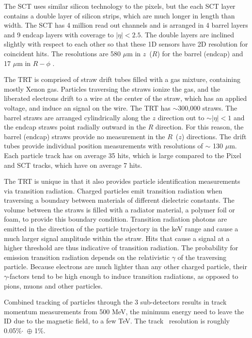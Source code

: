 The SCT uses similar silicon technology to the pixels, but the each SCT layer contains a double layer of silicon strips, which are much longer in length than width. The SCT has 4 million read out channels and is arranged in 4 barrel layers and 9 endcap layers with coverage to $|\eta| < 2.5$. The double layers are inclined slightly with respect to each other so that these 1D sensors have 2D resolution for coincident hits. The resolutions are 580 $\mu$m in $z$\ ($R$) for the barrel (endcap) and 17 $\mu$m in $R-\phi$ .

The TRT is comprised of straw drift tubes filled with a gas mixture, containing mostly Xenon gas. Particles traversing the straws ionize the gas, and the liberated electrons drift to a wire at the center of the straw, which has an applied voltage, and induce an signal on the wire. The TRT has $\sim$300,000 straws. The barrel straws are arranged cylindrically along the $z$ direction out to $\sim|\eta| < 1$ and the endcap straws point radially outward in the $R$ direction. For this reason, the barrel (endcap) straws provide no measurement in the $R$\ ($z$) directions. The drift tubes provide individual position measurements with resolutions of $\sim$ 130 $\mu$m. Each particle track has on average 35 hits, which is large compared to the Pixel and SCT tracks, which have on average 7 hits. 

The TRT is unique in that it also provides particle identification measurements via transition radiation. Charged particles emit transition radiation when traversing a boundary between materials of different dielectric constants. The volume between the straws is filled with a radiator material, a polymer foil or foam, to provide this boundary condition. Transition radiation photons are emitted in the direction of the particle trajectory in the keV range and cause a much larger signal amplitude within the straw. Hits that cause a signal at a higher threshold are thus indicative of transition radiation.  The probability for emission transition radiation depends on the relativistic $\gamma$ of the traversing particle. Because electrons are much lighter than any other charged particle, their $\gamma$-factors tend to be high enough to induce transition radiations, as opposed to pions, muons and other particles. 

Combined tracking of particles through the 3 sub-detectors results in track momentum measurements from 500 MeV, the minimum energy need to leave the ID due to the magnetic field, to a few TeV. The track \pt\ resolution is roughly 0.05\%$\cdot$\pt\ $\oplus$ 1\%.  

